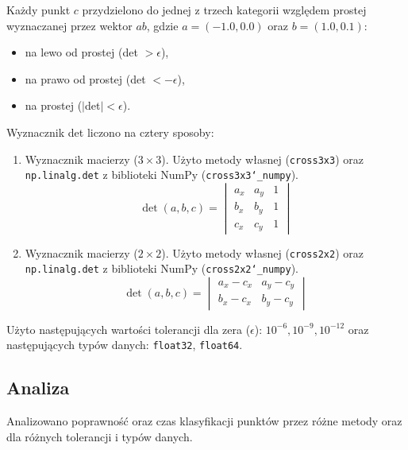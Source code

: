 \documentclass[11pt,a4paper]{article}
\begin{document}
    Każdy punkt $c$ przydzielono do jednej z trzech kategorii względem prostej wyznaczanej przez wektor $ab$, gdzie $a = (-1.0, 0.0)$ oraz $b = (1.0, 0.1)$:
    \begin{itemize}
        \item na lewo od prostej (det $> \epsilon$),
        \item na prawo od prostej (det $< -\epsilon$),
        \item na prostej ($|$det$| < \epsilon$). 
    \end{itemize}
    Wyznacznik det liczono na cztery sposoby:
    \begin{enumerate}
    \item Wyznacznik macierzy ($3 \times 3$). Użyto metody własnej (\texttt{cross3x3})
    oraz \texttt{np.linalg.det} z biblioteki NumPy (\texttt{cross3x3\char`_numpy}).
    \begin{equation}
        \det(a, b, c) = \begin{vmatrix}
            a_x & a_y & 1 \\
            b_x & b_y & 1 \\
            c_x & c_y & 1
        \end{vmatrix}
    \end{equation}

    \item Wyznacznik macierzy ($2 \times 2$). Użyto metody własnej (\texttt{cross2x2})
    oraz \texttt{np.linalg.det} z biblioteki NumPy (\texttt{cross2x2\char`_numpy}).
    \begin{equation}
        \det(a, b, c) = \begin{vmatrix}
            a_x - c_x & a_y - c_y \\
            b_x - c_x & b_y - c_y
        \end{vmatrix}
    \end{equation}
    \end{enumerate}

    Użyto następujących wartości tolerancji dla zera ($\epsilon$): $10^{-6},10^{-9}, 10^{-12}$ oraz następujących typów danych: \texttt{float32}, \texttt{float64}.

\subsection{Analiza}

Analizowano poprawność oraz czas klasyfikacji punktów przez różne metody oraz dla różnych tolerancji i typów danych.
\end{document}
